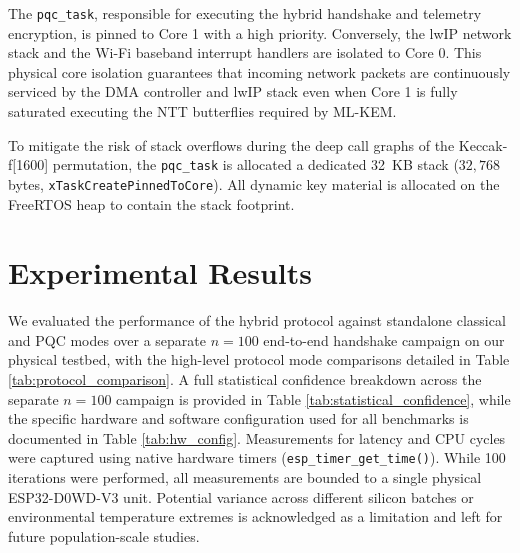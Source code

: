 \documentclass[journal, 10pt]{IEEEtran}
\begin{document}
The \texttt{pqc\_task}, responsible for executing the hybrid handshake and telemetry encryption, is pinned to Core 1 with a high priority. Conversely, the lwIP network stack and the Wi-Fi baseband interrupt handlers are isolated to Core 0. This physical core isolation guarantees that incoming network packets are continuously serviced by the DMA controller and lwIP stack even when Core 1 is fully saturated executing the NTT butterflies required by ML-KEM.

To mitigate the risk of stack overflows during the deep call graphs of the Keccak-f[1600] permutation, the \texttt{pqc\_task} is allocated a dedicated 32~KB stack ($32{,}768$ bytes, \texttt{xTaskCreatePinnedToCore}). All dynamic key material is allocated on the FreeRTOS heap to contain the stack footprint.

\section{Experimental Results}
We evaluated the performance of the hybrid protocol against standalone classical and PQC modes over a separate $n=100$ end-to-end handshake campaign on our physical testbed, with the high-level protocol mode comparisons detailed in Table \ref{tab:protocol_comparison}. A full statistical confidence breakdown across the separate $n=100$ campaign is provided in Table \ref{tab:statistical_confidence}, while the specific hardware and software configuration used for all benchmarks is documented in Table \ref{tab:hw_config}. Measurements for latency and CPU cycles were captured using native hardware timers (\texttt{esp\_timer\_get\_time()}). While 100 iterations were performed, all measurements are bounded to a single physical ESP32-D0WD-V3 unit. Potential variance across different silicon batches or environmental temperature extremes is acknowledged as a limitation and left for future population-scale studies.
\end{document}
